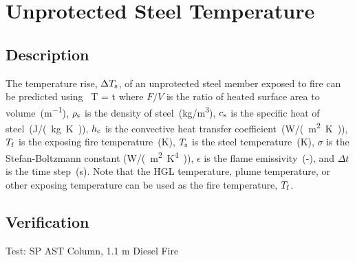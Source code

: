 \clearpage


\section{Unprotected Steel Temperature}

\subsection*{Description}

The temperature rise, $\Delta T\sb{s}$, of an unprotected steel member exposed to fire can be predicted using~\cite{SFPE:Milke2}
\be
\Delta T =    \Delta t
\label{eq:unprotected_steel}
\ee
where $F/V$ is the ratio of heated surface area to volume~(\si{m^{-1}}), $\rho\sb{s}$ is the density of steel~(\si{kg/m^3}), $c\sb{s}$ is the specific heat of steel~(\si{J/(kg.K)}), $h\sb{c}$ is the convective heat transfer coefficient~(\si{W/(m^2.K)}), $T\sb{f}$ is the exposing fire temperature~(\si{K}), $T\sb{s}$ is the steel temperature~(\si{K}), $\sigma$ is the Stefan-Boltzmann constant (\si{W/(m^2.K^4)}), $\epsilon$ is the flame emissivity~(-), and $\Delta t$ is the time step~(\si{s}). Note that the HGL temperature, plume temperature, or other exposing temperature can be used as the fire temperature, $T\sb{f}$.

\subsection*{Verification}

Test: SP AST Column, 1.1 m Diesel Fire

